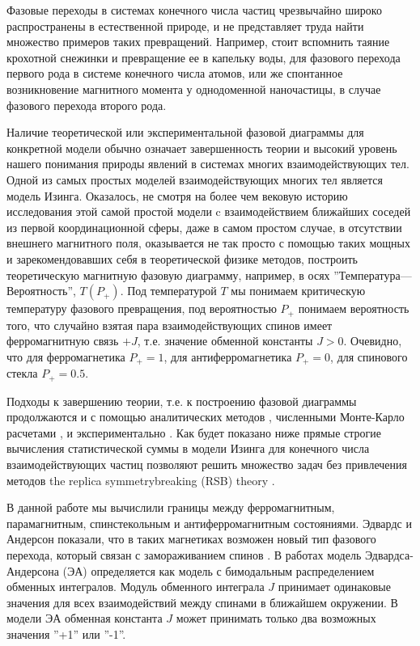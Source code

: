 
{\actuality} Фазовые переходы в системах конечного числа частиц чрезвычайно широко распространены в естественной природе, и не представляет труда найти множество примеров таких превращений. Например, стоит вспомнить таяние крохотной снежинки и превращение ее в капельку воды, для фазового перехода первого рода в системе конечного числа атомов, или же спонтанное возникновение магнитного момента у однодоменной наночастицы, в случае фазового перехода второго рода. 

Наличие теоретической или экспериментальной фазовой диаграммы для конкретной модели обычно означает завершенность теории и высокий уровень нашего понимания природы явлений в системах многих взаимодействующих тел. Одной из самых простых моделей взаимодействующих многих тел является модель Изинга. Оказалось, не смотря на более чем вековую историю исследования этой самой простой модели c взаимодействием ближайших соседей из первой координационной сферы, даже в самом простом случае, в отсутствии внешнего магнитного поля, оказывается не так просто с помощью таких мощных и зарекомендовавших себя в теоретической физике методов, построить теоретическую магнитную фазовую диаграмму, например, в осях ''Температура---Вероятность'', $T(P_+)$. Под температурой $T$ мы понимаем критическую температуру фазового превращения, под вероятностью $P_+$ понимаем вероятность того, что случайно взятая пара взаимодействующих спинов имеет ферромагнитную связь $+J$, т.е. значение обменной константы $J>0$. Очевидно, что для ферромагнетика $P_+=1$, для антиферромагнетика $P_+=0$, для спинового стекла $P_+=0.5$.

Подходы к завершению теории, т.е. к построению фазовой диаграммы продолжаются и с помощью аналитических методов \cite{belokon2006}, численными Монте-Карло расчетами \cite{Hasenbusch2008}, и экспериментально \cite{Mirebeau2022}. Как будет показано ниже прямые строгие вычисления статистической суммы в модели Изинга для конечного числа взаимодействующих частиц позволяют решить множество задач без привлечения методов the replica symmetrybreaking (RSB) theory \cite{newman2023proof}.

В данной работе мы вычислили границы между ферромагнитным, парамагнитным, спинстекольным и антиферромагнитным состояниями. Эдвардс и Андерсон показали, что в таких магнетиках возможен новый тип фазового перехода, который связан с замораживанием спинов \cite{edwards1975theory}. В работах \cite{Ground2010pmJ, Correlation2005SG} модель Эдвардса-Андерсона (ЭА) определяется как модель с бимодальным распределением обменных интегралов. Модуль обменного интеграла $J$ принимает одинаковые значения для всех взаимодействий между спинами в ближайшем окружении. В модели ЭА обменная константа $J$ может принимать только два возможных значения ''+1'' или ''-1''. 

